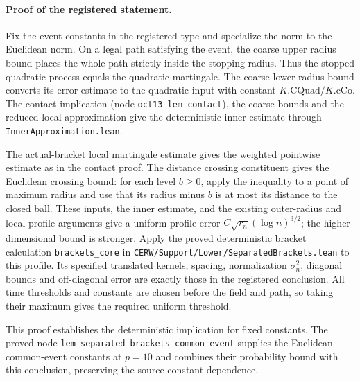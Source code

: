\paragraph{Proof of the registered statement.}
Fix the event constants in the registered type and specialize the norm to
the Euclidean norm. On a legal path satisfying the event, the coarse upper
radius bound places the whole path strictly inside the stopping radius.
Thus the stopped quadratic process equals the quadratic martingale.
The coarse lower radius bound converts its error estimate to the quadratic
input with constant $K.\mathrm{CQuad}/K.\mathrm{cCo}$.
The contact implication (node \texttt{oct13-lem-contact}), the coarse bounds
and the reduced local approximation give the deterministic inner estimate
through \texttt{InnerApproximation.lean}.

The actual-bracket local martingale estimate gives the weighted pointwise
estimate as in the contact proof. The distance crossing constituent gives
the Euclidean crossing bound: for each level $b\geq0$, apply the inequality
to a point of maximum radius and use that its radius minus $b$ is at most
its distance to the closed ball. These inputs, the inner estimate, and the existing
outer-radius and local-profile arguments give a uniform profile error
$C\sqrt{r_n}(\log n)^{3/2}$; the higher-dimensional bound is stronger.
Apply the proved deterministic bracket calculation
\texttt{brackets\_core} in \texttt{CERW/Support/Lower/SeparatedBrackets.lean} to this profile.
Its specified translated kernels, spacing, normalization $\sigma_n^2$,
diagonal bounds and off-diagonal error are exactly those in the registered
conclusion. All time thresholds and constants are chosen before the field
and path, so taking their maximum gives the required uniform threshold.

This proof establishes the deterministic implication for fixed constants.
The proved node \texttt{lem-separated-brackets-common-event} supplies the
Euclidean common-event constants at $p=10$ and combines their probability
bound with this conclusion, preserving the source constant dependence.
